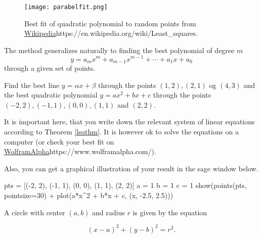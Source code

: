 \documentclass{article}
\begin{document}
\begin{example}
\begin{figure}
\texttt{[image: parabelfit.png]}
\caption{Best fit of quadratic polynomial to random points from  \url{Wikipedia}{https://en.wikipedia.org/wiki/Least_squares}.}
\end{figure}



The method generalizes naturally to finding the best polynomial of degree $m$
$$
y = a_m x^m + a_{m-1} x^{m-1} + \cdots + a_1 x + a_0 
$$
through a given set of points.
\end{example}

\beginshex
Find the best line $y = \alpha x + \beta$ through the points
$(1, 2), (2,1)$ og $(4,3)$ and the best quadratic polynomial
$ y = a x^2 + b x + c$ through the points
$(-2, 2), (-1, 1), (0,0), (1,1)$ and $(2,2)$.

It is important here, that you write down the relevant system
of linear equations according to Theorem \ref{lsqthm}.
It is however ok to solve the equations
on a computer (or check your best fit on \url{WolframAlpha}{https://www.wolframalpha.com/}).

Also, you can get a graphical illustration of your result in the sage window below.

\begin{sage}
pts = [(-2, 2), (-1, 1), (0, 0), (1, 1), (2, 2)]
a = 1
b = 1
c = 1
show(points(pts, pointsize=30) + plot(a*x^2 + b*x + c, (x, -2.5, 2.5)))
\end{sage}
\endshex


\beginshex
A circle with center $(a, b)$ and radius $r$ is given by the equation

\begin{equation}\label{eq:circle}
(x - a)^2 + (y - b)^2 = r^2.
\end{equation}
\end{document}
